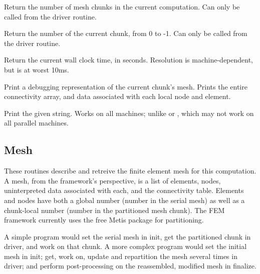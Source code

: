 \documentclass[10pt]{article}
\begin{document}

     Return the number of mesh chunks in the current computation.  Can
     only be called from the driver routine.


     Return the number of the current chunk, from 0 to
     -1.  Can only be called from the driver routine.


     Return the current wall clock time, in seconds.  Resolution is
     machine-dependent, but is at worst 10ms.


     Print a debugging representation of the current chunk's mesh.
     Prints the entire connectivity array, and data associated with
     each local node and element.


     Print the given string.  Works on all machines; unlike  or
     , which may not work on all parallel machines.

\subsection{Mesh}

These routines describe and retreive the finite element mesh for this
computation.  A mesh, from the framework's perspective, is a list of
elements, nodes, uninterpreted data associated with each, and the
connectivity table.  Elements and nodes have both a global number (number in
the serial mesh) as well as a chunk-local number (number in the partitioned
mesh chunk).  The FEM framework currently uses the free Metis package for
partitioning.

A simple program would set the serial mesh in init, get the partitioned
chunk in driver, and work on that chunk.  A more complex program would set
the initial mesh in init; get, work on, update and repartition the mesh
several times in driver; and perform post-processing on the reassembled,
modified mesh in finalize.
\end{document}
